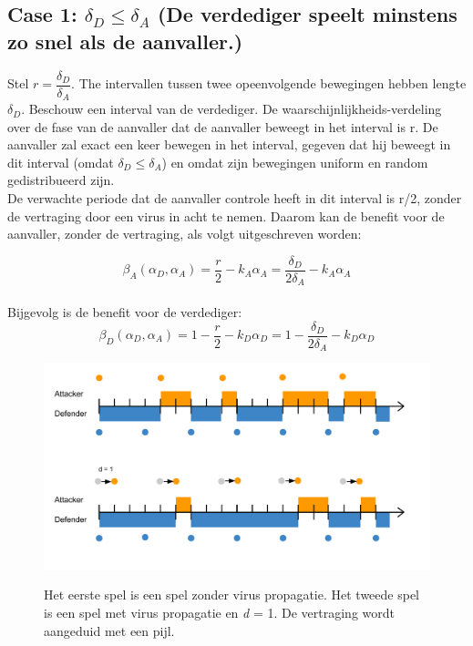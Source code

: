 \documentclass[master=cws, masteroption=vs,english]{kulemt}
\begin{document}
\begin{abstract*}
\subsection*{\textbf{Case 1:} $\delta_{D} \leq \delta_{A} $ (De verdediger speelt minstens zo snel als de aanvaller.) }

Stel $r = \dfrac{\delta_{D}}{ \delta_{A} }$. The intervallen tussen twee opeenvolgende bewegingen hebben lengte $\delta_{D}$. Beschouw een interval van de verdediger. De waarschijnlijkheids-verdeling over de fase van de aanvaller dat de aanvaller beweegt in het interval is r. De aanvaller zal exact een keer bewegen in het interval, gegeven dat hij beweegt in dit interval (omdat $\delta_{D} \leq \delta_{A} $) en omdat zijn bewegingen uniform en random gedistribueerd zijn. \\

De verwachte periode dat de aanvaller controle heeft in dit interval is r/2, zonder de vertraging door een virus in acht te nemen. Daarom kan de benefit voor de aanvaller, zonder de vertraging, als volgt uitgeschreven worden:

\begin{equation}\label{first}
\beta_{A}(\alpha_{D},\alpha_{A}) =\dfrac {r} {2} - k_{A} \alpha_{A} = \dfrac {\delta_{D}} {2\delta_{A}} - k_{A} \alpha_{A}  
\end{equation}\\

Bijgevolg is de benefit voor de verdediger:
\begin{equation}\label{first}
\beta_{D}(\alpha_{D},\alpha_{A}) =1 -  \dfrac {r} {2} - k_{D} \alpha_{D} = 1 - \dfrac {\delta_{D}} {2\delta_{A}} - k_{D} \alpha_{D} 
\end{equation}

\begin{figure}[hbtp]
\caption{Het eerste spel is een spel zonder virus propagatie. Het tweede spel is een spel met virus propagatie en \textit{d} = 1. De vertraging wordt aangeduid met een pijl.}
\centering
\includegraphics[scale=0.4]{../../doc/template/Images/FLipItCase1.pdf}
\label{fig:delaycase1}
\end{figure}



\end{abstract*}
\end{document}
